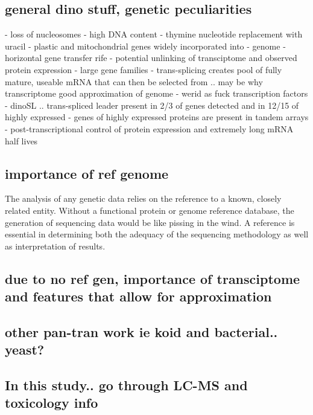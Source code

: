 \documentclass[12pt]{article}
\begin{document}
\subsection*{general dino stuff, genetic peculiarities}
 - loss of nucleosomes \cite{rizzo1972chromosomal}
- high DNA content \cite{lajeunesse2005symbiodinium}
- thymine nucleotide replacement with uracil \cite{rae1976hydroxymethyluracil}
- plastic and mitochondrial genes widely incorporated into - genome \cite{bachvaroff2004dinoflagellate}
- horizontal gene transfer rife
- potential unlinking of transciptome and observed protein expression \cite{bachvaroff2008stop}
- large gene families 
- trans-splicing creates pool of fully mature, useable mRNA that can then be selected from .. may be why transcriptome good approximation of genome \cite{lidie2007spliced,zhang2007spliced}
- werid as fuck transcription factors \cite{guillebault2002new}
- dinoSL .. trans-spliced leader present in 2/3 of genes detected and in 12/15 of highly expressed \cite{bachvaroff2008stop,lidie2007spliced}
- genes of highly expressed proteins are present in tandem arrays \cite{bachvaroff2008stop}
- post-transcriptional control of protein expression and extremely long mRNA half lives \cite{morey2013global}

\subsection*{importance of ref genome}
The analysis of any genetic data relies on the reference to a known, closely related entity. 
Without a functional protein or genome reference database, the generation of sequencing data would be like pissing in the wind. 
A reference is essential in determining both the adequacy of the sequencing methodology as well as interpretation of results. 
           

\subsection*{due to no ref gen, importance of transciptome and features that allow for approximation}

\subsection*{other pan-tran work ie koid and bacterial.. yeast?}

\subsection*{In this study.. go through LC-MS and toxicology info}
\end{document}
